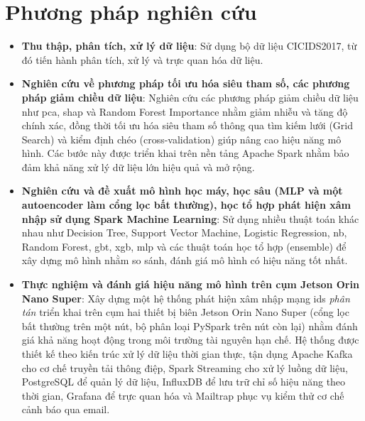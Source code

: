 \section{Phương pháp nghiên cứu}
\label{sec:PhuongPhap}

\begin{itemize}
  \item \textbf{Thu thập, phân tích, xử lý dữ liệu}: Sử dụng bộ dữ liệu CICIDS2017, từ đó tiến hành phân tích, xử lý và trực quan hóa dữ liệu.
  \item \textbf{Nghiên cứu về phương pháp tối ưu hóa siêu tham số, các phương pháp giảm chiều dữ liệu}: Nghiên cứu các phương pháp giảm chiều dữ liệu như \ac{pca}, \ac{shap} và Random Forest Importance nhằm giảm nhiễu và tăng độ chính xác, đồng thời tối ưu hóa siêu tham số thông qua tìm kiếm lưới (Grid Search) và kiểm định chéo (cross-validation) giúp nâng cao hiệu năng mô hình. Các bước này được triển khai trên nền tảng Apache Spark nhằm bảo đảm khả năng xử lý dữ liệu lớn hiệu quả và mở rộng.
  \item \textbf{Nghiên cứu và đề xuất mô hình học máy, học sâu (MLP và một autoencoder làm cổng lọc bất thường), học tổ hợp phát hiện xâm nhập sử dụng Spark Machine Learning}: Sử dụng nhiều thuật toán khác nhau như Decision Tree, Support Vector Machine, Logistic Regression, \ac{nb}, Random Forest, \ac{gbt}, \ac{xgb}, \ac{mlp} và các thuật toán học tổ hợp (ensemble) để xây dựng mô hình nhằm so sánh, đánh giá mô hình có hiệu năng tốt nhất.
  \item \textbf{Thực nghiệm và đánh giá hiệu năng mô hình trên cụm Jetson Orin Nano Super}: Xây dựng một hệ thống phát hiện xâm nhập mạng \ac{ids} \emph{phân tán} triển khai trên cụm hai thiết bị biên Jetson Orin Nano Super (cổng lọc bất thường trên một nút, bộ phân loại PySpark trên nút còn lại) nhằm đánh giá khả năng hoạt động trong môi trường tài nguyên hạn chế. Hệ thống được thiết kế theo kiến trúc xử lý dữ liệu thời gian thực, tận dụng Apache Kafka cho cơ chế truyền tải thông điệp, Spark Streaming cho xử lý luồng dữ liệu, PostgreSQL để quản lý dữ liệu, InfluxDB để lưu trữ chỉ số hiệu năng theo thời gian, Grafana để trực quan hóa và Mailtrap phục vụ kiểm thử cơ chế cảnh báo qua email.
\end{itemize}

